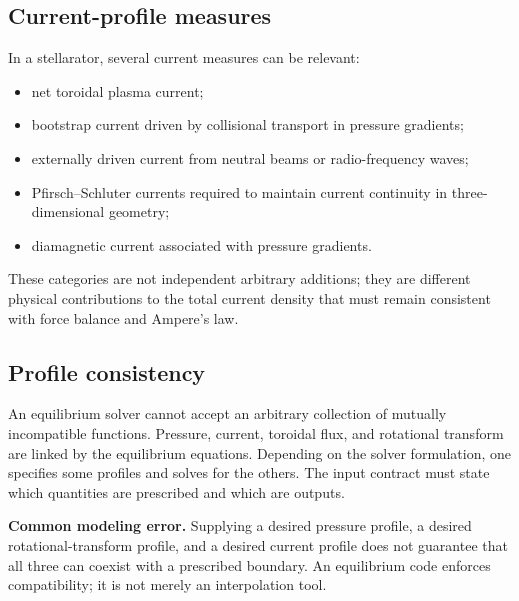 \subsection{Current-profile measures}
In a stellarator, several current measures can be relevant:
\begin{itemize}[leftmargin=1.6em]
\item net toroidal plasma current;
\item bootstrap current driven by collisional transport in pressure gradients;
\item externally driven current from neutral beams or radio-frequency waves;
\item Pfirsch--Schluter currents required to maintain current continuity in three-dimensional geometry;
\item diamagnetic current associated with pressure gradients.
\end{itemize}
These categories are not independent arbitrary additions; they are different physical contributions to the total current density that must remain consistent with force balance and Ampere's law.

\subsection{Profile consistency}
An equilibrium solver cannot accept an arbitrary collection of mutually incompatible functions. Pressure, current, toroidal flux, and rotational transform are linked by the equilibrium equations. Depending on the solver formulation, one specifies some profiles and solves for the others. The input contract must state which quantities are prescribed and which are outputs.

\begin{notebox}
\textbf{Common modeling error.} Supplying a desired pressure profile, a desired rotational-transform profile, and a desired current profile does not guarantee that all three can coexist with a prescribed boundary. An equilibrium code enforces compatibility; it is not merely an interpolation tool.
\end{notebox}

